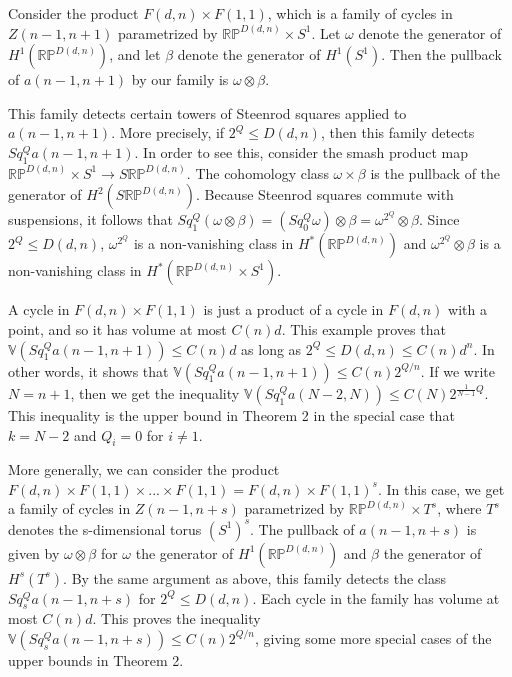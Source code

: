 \documentclass{amsart}
\newtheorem*{Theorem 1}{Theorem 1}
\newtheorem*{Theorem 2}{Theorem 2}
\newtheorem*{Theorem 1A}{Theorem 1A}
\newtheorem*{Theorem 2A}{Theorem 2A}
\newtheorem*{vanishing lemma}{Vanishing Lemma}
\numberwithin{equation}{section}
\begin{document}
Consider the product $F(d,n) \times F(1,1)$, which is a family of
cycles in $Z(n-1, n+1)$ parametrized by $\mathbb{RP}^{D(d,n)}
\times S^1$.  Let $\omega$ denote the generator of
$H^1(\mathbb{RP}^{D(d,n)})$, and let $\beta$ denote the generator
of $H^1(S^1)$.  Then the pullback of $a(n-1,n+1)$ by our family is
$\omega \otimes \beta$.

This family detects certain towers of Steenrod squares applied to
$a(n-1,n+1)$.  More precisely, if $2^Q \le D(d,n)$, then this
family detects $Sq_1^Q a(n-1,n+1)$.  In order to see this, consider
the smash product map $\mathbb{RP}^{D(d,n)} \times S^1
\rightarrow S \mathbb{RP}^{D(d,n)}$.  The cohomology class
$\omega \times \beta$ is the pullback of the generator of $H^2(S
\mathbb{RP}^{D(d,n)})$.  Because Steenrod squares commute with
suspensions, it follows that $Sq_1^Q (\omega \otimes \beta) =
(Sq_0^Q \omega) \otimes \beta = \omega^{2^Q} \otimes \beta$. 
Since $2^Q \le D(d,n)$, $\omega^{2^Q}$ is a non-vanishing class
in $H^*(\mathbb{RP}^{D(d,n)})$ and $\omega^{2^Q} \otimes \beta$
is a non-vanishing class in $H^*(\mathbb{RP}^{D(d,n)} \times
S^1)$.

A cycle in $F(d,n) \times F(1,1)$ is just a product of a cycle in
$F(d,n)$ with a point, and so it has volume at most $C(n) d$. 
This example proves that $\mathbb{V}(Sq_1^Q a(n-1,n+1)) \le C(n)
d$ as long as $2^Q \le D(d,n) \le C(n) d^n$.  In other words, it
shows that $\mathbb{V}(Sq_1^Q a(n-1,n+1)) \le C(n) 2^{Q/n}$.  If
we write $N = n+1$, then we get the inequality $\mathbb{V}(Sq_1^Q
a(N-2, N)) \le C(N) 2^{\frac{1}{N-1} Q}$.  This
inequality is the upper bound in Theorem 2 in the special case
that $k = N-2$ and $Q_i = 0$ for $i \not= 1$.

More generally, we can consider the product $F(d,n) \times F(1,1)
\times ... \times F(1,1) = F(d,n) \times F(1,1)^s$.  In this
case, we get a family of cycles in $Z(n-1, n+s)$ parametrized by
$\mathbb{RP}^{D(d,n)} \times T^s$, where $T^s$ denotes the
s-dimensional torus $(S^1)^s$.  The pullback of $a(n-1, n+s)$ is
given by $\omega \otimes \beta$ for $\omega$ the generator of
$H^1(\mathbb{RP}^{D(d,n)})$ and $\beta$ the generator of
$H^s(T^s)$.  By the same argument as above, this family detects
the class $Sq_s^Q a(n-1, n+s)$ for $2^Q \le D(d,n)$.  Each cycle
in the family has volume at most $C(n) d$.  This proves the
inequality $\mathbb{V}(Sq_s^Q a(n-1, n+s)) \le C(n) 2^{Q/n}$,
giving some more special cases of the upper bounds in Theorem 2.

\vskip5pt
\end{document}
